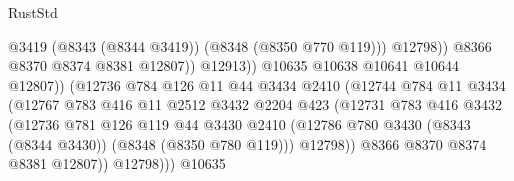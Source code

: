 \begin{lexlean}{RustStd}
\begin{coremodule}
                                                @3419
                                                (@8343 (@8344 @3419))
                                                (@8348 (@8350 @770 @119)))
                                              @12798))
                                          @8366
                                          @8370
                                          @8374
                                          @8381
                                          @12807))
                                      @12913))
                                  @10635
                                  @10638
                                  @10641
                                  @10644
                                  @12807))
                              (@12736
                                @784
                                @126
                                @11
                                @44
                                @3434
                                @2410
                                (@12744
                                  @784
                                  @11
                                  @3434
                                  (@12767
                                    @783
                                    @416
                                    @11
                                    @2512
                                    @3432
                                    @2204
                                    @423
                                    (@12731
                                      @783
                                      @416
                                      @3432
                                      (@12736
                                        @781
                                        @126
                                        @119
                                        @44
                                        @3430
                                        @2410
                                        (@12786
                                          @780
                                          @3430
                                          (@8343 (@8344 @3430))
                                          (@8348 (@8350 @780 @119)))
                                        @12798))
                                    @8366
                                    @8370
                                    @8374
                                    @8381
                                    @12807))
                                @12798)))
                          @10635

\end{coremodule}
\end{lexlean}
